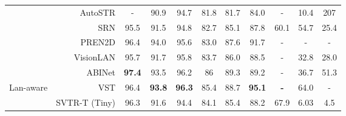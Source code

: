 \documentclass{article}
\begin{document}
\begin{table*}[ht]
{\begin{tabular}{c|r|ccc|ccc|c|cc}
                                & AutoSTR\cite{zhang2020autostr}    & -                                    & 90.9                                 & 94.7                                 & 81.8                                 & 81.7                                 & 84.0                                   & -                                   & 10.4                    & 207                     \\
                                & SRN\cite{yu2020srn}        & 95.5                                 & 91.5                                 & 94.8                                 & 82.7                                 & 85.1                                 & 87.8                                 & 60.1                                & 54.7                       & 25.4                       \\
                                & PREN2D\cite{yan2021pren}     & 96.4                                 & 94.0                                   & 95.6                                 & 83.0                                   & 87.6                                 & 91.7                                 & -                                   & -                        & -                       \\
                                & VisionLAN\cite{Wang_2021_visionlan}      & 95.7                                 & 91.7                                 & 95.8                                 & 83.7                                 & 86.0                                   & 88.5                                 & -                                   & 32.8                    & 28.0                      \\
                                & ABINet\cite{fang2021abinet}     & {\textbf{97.4}} & {93.5}                           & 96.2                                 & {86}                             & {89.3}                           & 89.2                                 & -                                   & 36.7                     & 51.3                    \\
\multirow{-11}{*}{Lan-aware}    & VST\cite{tang2021vst}        & 96.4                                 & {\textbf{93.8}} & {\textbf{96.3}} & 85.4                                 & 88.7                                 & {\textbf{95.1}} & \textbf{-}                          & 64.0                    & -                       \\
\midrule
                                & \multicolumn{1}{c|}{SVTR-T (Tiny)}     & 96.3                                & 91.6                                 & 94.4                                 & 84.1                                 & 85.4                                 & 88.2                                 & 67.9                                   & 6.03                     & 4.5                    


\end{tabular}}
\end{table*}
\end{document}
